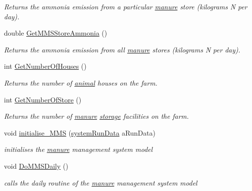 \begin{DoxyCompactItemize}
\begin{DoxyCompactList}\small\item\em Returns the ammonia emission from a particular \hyperlink{classmanure}{manure} store (kilograms N per day). \item\end{DoxyCompactList}\item 
double \hyperlink{class_m_m_s_class_a9681bb2179235730d1c4fb14e4616b42}{GetMMSStoreAmmonia} ()
\begin{DoxyCompactList}\small\item\em Returns the ammonia emission from all \hyperlink{classmanure}{manure} stores (kilograms N per day). \item\end{DoxyCompactList}\item 
int \hyperlink{class_m_m_s_class_adbc93d6a32b07724687b496aa0f863e2}{GetNumberOfHouses} ()
\begin{DoxyCompactList}\small\item\em Returns the number of \hyperlink{classanimal}{animal} houses on the farm. \item\end{DoxyCompactList}\item 
int \hyperlink{class_m_m_s_class_a10aa9739fcd0d54b15b3a49bdeca126e}{GetNumberOfStore} ()
\begin{DoxyCompactList}\small\item\em Returns the number of \hyperlink{classmanure}{manure} \hyperlink{classstorage}{storage} facilities on the farm. \item\end{DoxyCompactList}\item 
void \hyperlink{class_m_m_s_class_abf02bcf9d78d35dddf2867d390f87adb}{initialise\_\-MMS} (\hyperlink{classsystem_run_data}{systemRunData} aRunData)
\begin{DoxyCompactList}\small\item\em initialises the \hyperlink{classmanure}{manure} management system model \item\end{DoxyCompactList}\item 
void \hyperlink{class_m_m_s_class_a1876166aaad56d81c6144ddf53bab15c}{DoMMSDaily} ()
\begin{DoxyCompactList}\small\item\em calls the daily routine of the \hyperlink{classmanure}{manure} management system model \item\end{DoxyCompactList}\item 

\end{DoxyCompactItemize}
